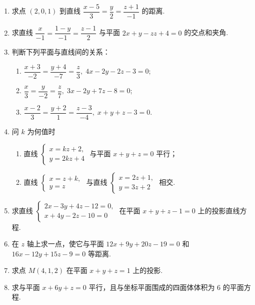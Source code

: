 \begin{enumerate}
    \item 求点 $(2, 0, 1)$ 到直线 $\dfrac{x-5}{3}=\dfrac{y}{2}=\dfrac{z+1}{-1}$ 的距离.
    
    \item 求直线 $\dfrac{x}{-1}=\dfrac{1-y}{-1}=\dfrac{z-1}{2}$ 与平面 $2x+y-zz+4=0$ 的交点和夹角.
    
    \item 判断下列平面与直线间的关系：
    \begin{enumerate}[(1)]\setlength{\itemsep}{5pt}\setlength{\topsep}{15pt}
        \item $\dfrac{x+3}{-2}=\dfrac{y+4}{-7}=\dfrac{z}{3},\;4x-2y-2z-3=0$;
        \item $\dfrac{x}{3}=\dfrac{y}{-2}=\dfrac{z}{7},\;3x-2y+7z-8=0$;
        \item $\dfrac{x-2}{3}=\dfrac{y+2}{1}=\dfrac{z-3}{-4},\;x+y+z-3=0$.
    \end{enumerate}

    \item 问 $k$ 为何值时
    \begin{enumerate}[(1)]\setlength{\itemsep}{5pt}\setlength{\topsep}{15pt}
        \item 直线 $\begin{cases}
            x=kz+2,\\
            y=2kz+4
        \end{cases}$ 与平面 $x+y+z=0$ 平行；
        \item 直线 $\begin{cases}
            x=z+k,\\
            y=z
        \end{cases}$ 与直线 $\begin{cases}
            x=2z+1,\\
            y=3z+2
        \end{cases}$ 相交.
    \end{enumerate}

    \item 求直线 $\begin{cases}
        2x-3y+4z-12=0,\\
        x+4y-2z-10=0
    \end{cases}$ 在平面 $x+y+z-1=0$ 上的投影直线方程.

    \item 在 $z$ 轴上求一点，使它与平面 $12x+9y+20z-19=0$ 和 $16x-12y+15z-9=0$ 等距离.
    
    \item 求点 $M(4, 1, 2)$ 在平面 $x+y+z=1$ 上的投影.
    
    \item 求与平面 $x+6y+z=0$ 平行，且与坐标平面围成的四面体体积为 $6$ 的平面方程.
\end{enumerate}

